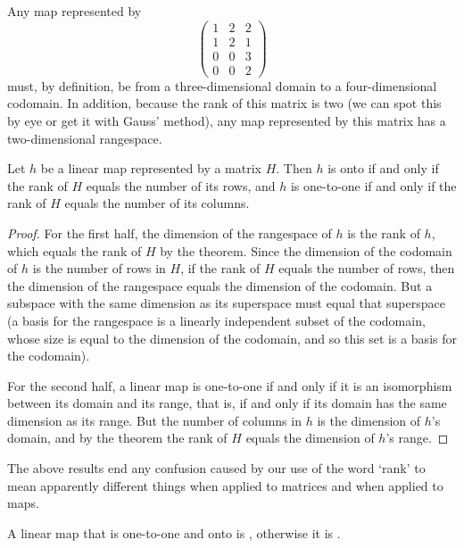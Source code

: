 \begin{example}
Any map represented by
\begin{equation*}
    \begin{pmatrix}
      1  &2  &2  \\
      1  &2  &1  \\
      0  &0  &3  \\
      0  &0  &2
    \end{pmatrix}
\end{equation*}
must, by definition, be from a three-dimensional domain
to a four-dimensional codomain.
In addition, because the rank of this matrix is two 
(we can spot this by eye or get it with Gauss' method),
any map represented by this matrix has a two-dimensional rangespace.
\end{example}

\begin{corollary} \label{cor:MatDescsMap}
Let $h$ be a linear map represented by a matrix $H$.
Then $h$ is onto if and only if the rank of $H$ equals the number 
of its rows, 
and $h$ is one-to-one if and only if the rank of $H$ equals the number of
its columns.
\end{corollary}

\begin{proof}
For the first half, the dimension of the rangespace of $h$ is the rank of $h$,
which equals the rank of $H$ by the theorem.
Since the dimension of the codomain of $h$ is the number of rows in $H$,
if the rank of $H$ equals the number of rows, then the dimension of the
rangespace equals the dimension of the codomain.
But a subspace with the same dimension as its superspace must equal
that superspace
(a basis for the rangespace is a linearly independent subset of the codomain,
whose size is equal to the dimension of the codomain, and so this set is 
a basis for the codomain).

For the second half, 
a linear map is one-to-one if and only if it is an isomorphism
between its domain and its range, that is, if and only if its domain has the
same dimension as its range.
But the number of columns in $h$ is the dimension of $h$'s domain, and
by the theorem the rank of $H$ equals the dimension of 
$h$'s range.
\end{proof}

The above results end any confusion caused by our use of the
word `rank' to mean apparently different things when applied to matrices and
when applied to maps.

\begin{definition}
A linear map that is one-to-one and onto is 
%
, otherwise it is 
%
.
\end{definition}

